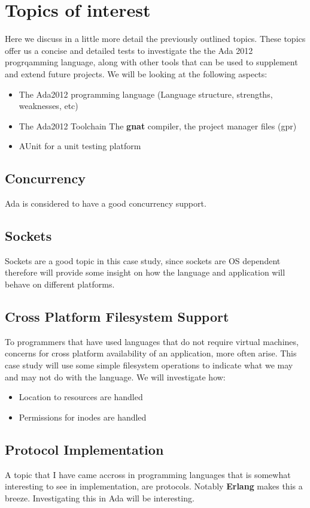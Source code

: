 \section{Topics of interest}
Here we discuss in a little more detail the previously outlined topics. These topics offer us a concise and detailed tests to investigate the the Ada 2012 progrqamming language, along with other tools that can be used to supplement and extend future projects. We will be looking at the following aspects:
\begin{itemize}
\item{The Ada2012} programming language (Language structure, strengths, weaknesses, etc)
\item{The Ada2012 Toolchain} The \textbf{gnat} compiler, the project manager files (gpr)
\item{AUnit} for a unit testing platform
\end{itemize}

\subsection{Concurrency}
Ada is considered to have a good concurrency support. 

\subsection{Sockets}
Sockets are a good topic in this case study, since sockets are OS dependent
therefore will provide some insight on how the language and application will
behave on different platforms. 

\subsection{Cross Platform Filesystem Support}
To programmers that have used languages that do not require virtual machines, concerns for cross platform availability of an application, more often arise. This case study will use some simple filesystem operations to indicate what we may and may not do with the language. We will investigate how:
\begin{itemize}
  \item Location to resources are handled
  \item Permissions for inodes are handled
\end{itemize}

\subsection{Protocol Implementation}
A topic that I have came accross in programming languages that is somewhat
interesting to see in implementation, are protocols. Notably \textbf{Erlang} 
makes this a breeze. Investigating this in Ada will be interesting. 

